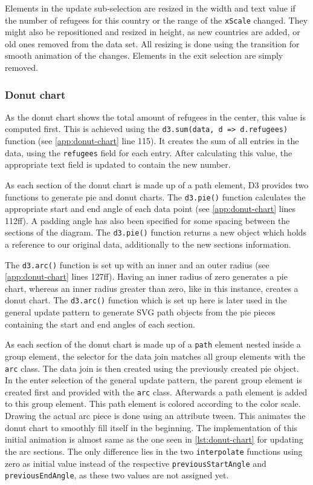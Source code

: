 Elements in the update sub-selection are resized in the width and text value if the number of refugees for this country or the range of the \texttt{xScale} changed. They might also be repositioned and resized in height, as new countries are added, or old ones removed from the data set. All resizing is done using the transition for smooth animation of the changes. Elements in the exit selection are simply removed.

\subsubsection{Donut chart}

As the donut chart shows the total amount of refugees in the center, this value is computed first. This is achieved using the \texttt{d3.sum(data, d => d.refugees)} function (see \ref{app:donut-chart} line 115). It creates the sum of all entries in the data, using the \texttt{refugees} field for each entry. After calculating this value, the appropriate text field is updated to contain the new number.

As each section of the donut chart is made up of a path element, D3 provides two functions to generate pie and donut charts. The \texttt{d3.pie()} function calculates the appropriate start and end angle of each data point (see \ref{app:donut-chart} lines 112ff). A padding angle has also been specified for some spacing between the sections of the diagram. The \texttt{d3.pie()} function returns a new object which holds a reference to our original data, additionally to the new sections information. 

The \texttt{d3.arc()} function is set up with an inner and an outer radius (see \ref{app:donut-chart} lines 127ff). Having an inner radius of zero generates a pie chart, whereas an inner radius greater than zero, like in this instance, creates a donut chart. The \texttt{d3.arc()} function which is set up here is later used in the general update pattern to generate SVG path objects from the pie pieces containing the start and end angles of each section.

As each section of the donut chart is made up of a \texttt{path} element nested inside a group element, the selector for the data join matches all group elements with the \texttt{arc} class. The data join is then created using the previously created pie object. In the enter selection of the general update pattern, the parent group element is created first and provided with the \texttt{arc} class. Afterwards a path element is added to this group element. This path element is colored according to the color scale. Drawing the actual arc piece is done using an attribute tween. This animates the donut chart to smoothly fill itself in the beginning. The implementation of this initial animation is almost same as the one seen in \ref{lst:donut-chart} for updating the arc sections. The only difference lies in the two \texttt{interpolate} functions using zero as initial value instead of the respective \texttt{previousStartAngle} and \texttt{previousEndAngle}, as these two values are not assigned yet.

